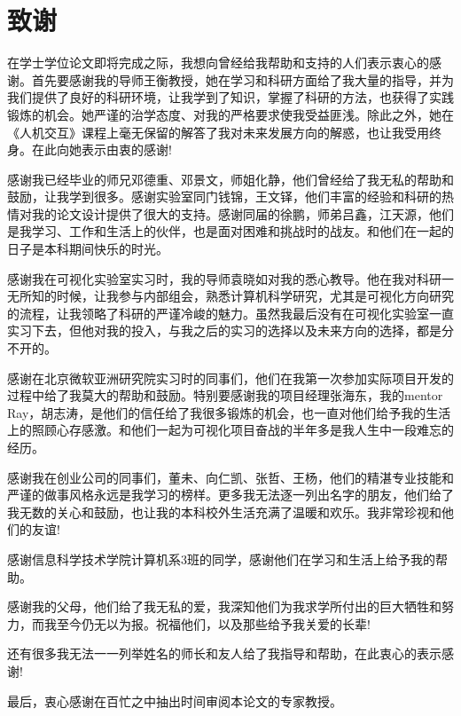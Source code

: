 \chapter{致谢}

在学士学位论文即将完成之际，我想向曾经给我帮助和支持的人们表示衷心的感谢。首先要感谢我的导师王衡教授，她在学习和科研方面给了我大量的指导，并为我们提供了良好的科研环境，让我学到了知识，掌握了科研的方法，也获得了实践锻炼的机会。她严谨的治学态度、对我的严格要求使我受益匪浅。除此之外，她在《人机交互》课程上毫无保留的解答了我对未来发展方向的解惑，也让我受用终身。在此向她表示由衷的感谢!

感谢我已经毕业的师兄邓德重、邓景文，师姐化静，他们曾经给了我无私的帮助和鼓励，让我学到很多。感谢实验室同门钱锦，王文铎，他们丰富的经验和科研的热情对我的论文设计提供了很大的支持。感谢同届的徐鹏，师弟吕鑫，江天源，他们是我学习、工作和生活上的伙伴，也是面对困难和挑战时的战友。和他们在一起的日子是本科期间快乐的时光。

感谢我在可视化实验室实习时，我的导师袁晓如对我的悉心教导。他在我对科研一无所知的时候，让我参与内部组会，熟悉计算机科学研究，尤其是可视化方向研究的流程，让我领略了科研的严谨冷峻的魅力。虽然我最后没有在可视化实验室一直实习下去，但他对我的投入，与我之后的实习的选择以及未来方向的选择，都是分不开的。

感谢在北京微软亚洲研究院实习时的同事们，他们在我第一次参加实际项目开发的过程中给了我莫大的帮助和鼓励。特别要感谢我的项目经理张海东，我的mentor Ray，胡志涛，是他们的信任给了我很多锻炼的机会，也一直对他们给予我的生活上的照顾心存感激。和他们一起为可视化项目奋战的半年多是我人生中一段难忘的经历。

感谢我在创业公司的同事们，董未、向仁凯、张哲、王杨，他们的精湛专业技能和严谨的做事风格永远是我学习的榜样。更多我无法逐一列出名字的朋友，他们给了我无数的关心和鼓励，也让我的本科校外生活充满了温暖和欢乐。我非常珍视和他们的友谊!

感谢信息科学技术学院计算机系3班的同学，感谢他们在学习和生活上给予我的帮助。

感谢我的父母，他们给了我无私的爱，我深知他们为我求学所付出的巨大牺牲和努力，而我至今仍无以为报。祝福他们，以及那些给予我关爱的长辈!

还有很多我无法一一列举姓名的师长和友人给了我指导和帮助，在此衷心的表示感谢!

最后，衷心感谢在百忙之中抽出时间审阅本论文的专家教授。
